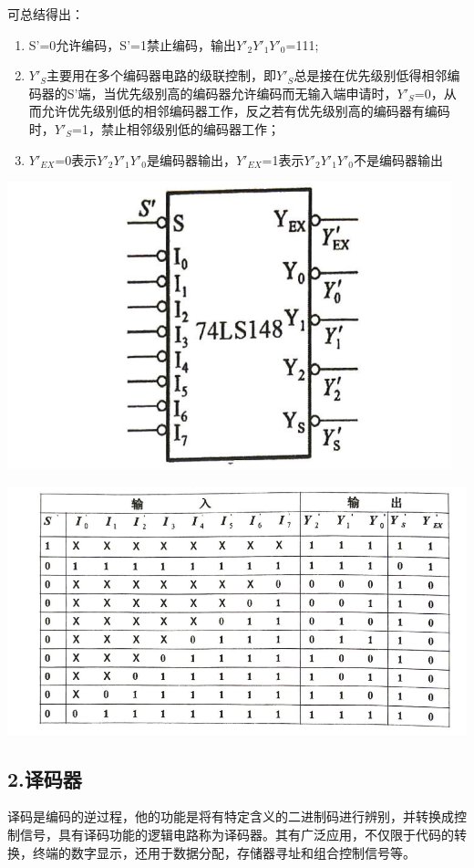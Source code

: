\documentclass{ctexart}
\begin{document}
    可总结得出：
    \begin{enumerate}[(1)]
        \item S'=0允许编码，S'=1禁止编码，输出$Y'_2Y'_1Y'_0$=111;
        \item $Y'_S$主要用在多个编码器电路的级联控制，即$Y'_S$总是接在优先级别低得相邻编码器的S’端，当优先级别高的编码器允许编码而无输入端申请时，$Y'_S$=0，从而允许优先级别低的相邻编码器工作，反之若有优先级别高的编码器有编码时，$Y'_S$=1，禁止相邻级别低的编码器工作；
        \item $Y'_{EX}$=0表示$Y'_2Y'_1Y'_0$是编码器输出，$Y'_{EX}$=1表示$Y'_2Y'_1Y'_0$不是编码器输出
    \end{enumerate}
    \begin{minipage}[c]{0.5\textwidth}
        \centering
        \includegraphics[width=0.8\linewidth]{2.1.1.png} 
    \end{minipage}
    \begin{minipage}[c]{0.45\textwidth}
        \centering
        \includegraphics[width=1.2\linewidth]{2.1.2.png} 
    \end{minipage}
    
    \subsection*{2.译码器}
    译码是编码的逆过程，他的功能是将有特定含义的二进制码进行辨别，并转换成控制信号，具有译码功能的逻辑电路称为译码器。其有广泛应用，不仅限于代码的转换，终端的数字显示，还用于数据分配，存储器寻址和组合控制信号等。
\end{document}
